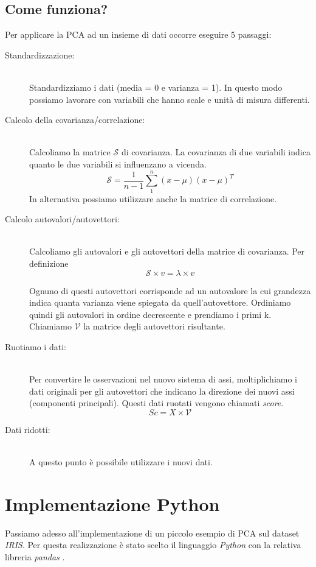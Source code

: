 \documentclass[12pt]{article}
\begin{document}
	\subsection{Come funziona?}
		Per applicare la \ac{PCA} ad un insieme di dati occorre eseguire 5 passaggi:	
		\begin{description}
			\item[Standardizzazione:] \hfill \\
			 Standardizziamo i dati (media = 0 e varianza = 1). In questo modo possiamo lavorare con variabili che hanno scale e unità di misura differenti.
			\item[Calcolo della covarianza/correlazione:] \hfill \\
			Calcoliamo la matrice $\mathcal{S}$ di covarianza. La covarianza di due variabili indica quanto le due variabili si influenzano a vicenda.
			$$\mathcal{S} = \frac{1}{n-1} \sum_{1}^{n} (x-\mu)(x-\mu)^T$$
			In alternativa possiamo utilizzare anche la matrice di correlazione.
			\item[Calcolo autovalori/autovettori:] \hfill \\ 
			Calcoliamo gli autovalori e gli autovettori della matrice di covarianza. Per definizione $$\mathcal{S} \times v = \lambda \times v$$
			
			Ognuno di questi autovettori corrisponde ad un autovalore la cui grandezza indica quanta varianza viene spiegata da quell'autovettore. Ordiniamo quindi gli autovalori in ordine decrescente e prendiamo i primi k. Chiamiamo $\mathcal{V}$ la matrice degli autovettori risultante.
			\item[Ruotiamo i dati:] \hfill \\
			Per convertire le osservazioni nel nuovo sistema di assi, moltiplichiamo i dati originali per gli autovettori che indicano la direzione dei nuovi assi (componenti principali). Questi dati ruotati vengono chiamati \emph{score}. $$Sc = X \times \mathcal{V}$$
			\item[Dati ridotti:] \hfill \\
			A questo punto è possibile utilizzare i nuovi dati.
		\end{description}
	
\section{Implementazione Python}

	Passiamo adesso all'implementazione di un piccolo esempio di \ac{PCA} sul dataset \emph{IRIS}. Per questa realizzazione è stato scelto il linguaggio \emph{Python} con la relativa libreria \emph{pandas} \cite{pandasSite}.
\end{document}
